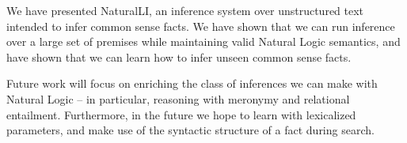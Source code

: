 We have presented NaturalLI, an inference system over
  unstructured text intended to infer common sense facts.
We have shown that we can run inference over a large set of premises
  while maintaining valid Natural Logic semantics, and have shown that
  we can learn how to infer unseen common sense facts.

Future work will focus on enriching the class of inferences we can
  make with Natural Logic -- in particular, reasoning with meronymy
  and relational entailment.
Furthermore, in the future we hope to learn with lexicalized parameters,
  and make use of the syntactic structure of a fact during search.
